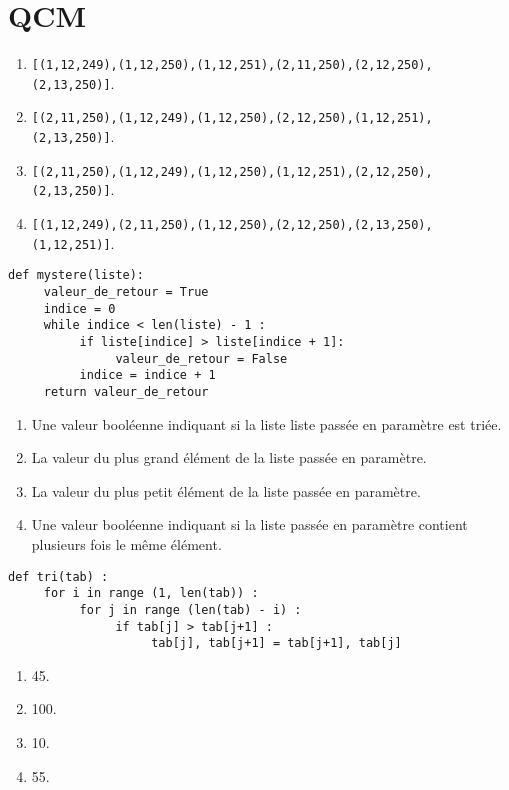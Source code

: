 \section{QCM}
\begin{multicols}{2}
\begin{enumerate}
\item \texttt{[(1,12,249),(1,12,250),(1,12,251),(2,11,250),(2,12,250),(2,13,250)]}.
\item \texttt{[(2,11,250),(1,12,249),(1,12,250),(2,12,250),(1,12,251),(2,13,250)]}.%
\item \texttt{[(2,11,250),(1,12,249),(1,12,250),(1,12,251),(2,12,250),(2,13,250)]}.
\item \texttt{[(1,12,249),(2,11,250),(1,12,250),(2,12,250),(2,13,250),(1,12,251)]}.
\end{enumerate}

\begin{lstlisting}
def mystere(liste):
     valeur_de_retour = True
     indice = 0
     while indice < len(liste) - 1 :
          if liste[indice] > liste[indice + 1]:
               valeur_de_retour = False
          indice = indice + 1
     return valeur_de_retour
\end{lstlisting}
\begin{enumerate}
\item Une valeur booléenne indiquant si la liste liste passée en paramètre est triée. %
\item La valeur du plus grand élément de la liste passée en paramètre.
\item La valeur du plus petit élément de la liste passée en paramètre.
\item Une valeur booléenne indiquant si la liste passée en paramètre contient plusieurs fois le même élément.
\end{enumerate}

\begin{lstlisting}
def tri(tab) :
     for i in range (1, len(tab)) :
          for j in range (len(tab) - i) :
               if tab[j] > tab[j+1] :
                    tab[j], tab[j+1] = tab[j+1], tab[j]
\end{lstlisting}
\begin{enumerate}
\item 45. %
\item 100.
\item 10.
\item 55.
\end{enumerate}


\end{multicols}
